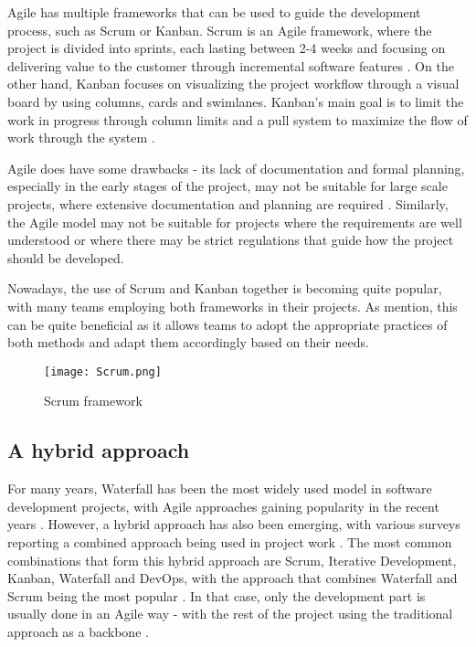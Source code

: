Agile has multiple frameworks that can be used to guide the development process, such as Scrum or Kanban. Scrum is an Agile framework, where the project is divided into sprints, each lasting between 2-4 weeks and focusing on delivering value to the customer through incremental software features \parencite{scrumban, agile}. On the other hand, Kanban focuses on visualizing the project workflow through a visual board by using columns, cards and swimlanes. Kanban's main goal is to limit the work in progress through column limits and a pull system to maximize the flow of work through the system \parencite{agile}.

Agile does have some drawbacks - its lack of documentation and formal planning, especially in the early stages of the project, may not be suitable for large scale projects, where extensive documentation and planning are required \parencite{sdlc1, agile, sdlc2}. Similarly, the Agile model may not be suitable for projects where the requirements are well understood or where there may be strict regulations that guide how the project should be developed.

Nowadays, the use of Scrum and Kanban together is becoming quite popular, with many teams employing both frameworks in their projects. As \textcite{scrumban} mention, this can be quite beneficial as it allows teams to adopt the appropriate practices of both methods and adapt them accordingly based on their needs.

\begin{figure}[ht]
    \centering
    \texttt{[image: Scrum.png]}
    \caption{Scrum framework}
    \label{fig:scrum}
\end{figure}

\subsection{A hybrid approach}

For many years, Waterfall has been the most widely used model in software development projects, with Agile approaches gaining popularity in the recent years \parencite{hybrid1}. However, a hybrid approach has also been emerging, with various surveys reporting a combined approach being used in project work \parencite{hybrid1,hybrid2}. The most common combinations that form this hybrid approach are Scrum, Iterative Development, Kanban, Waterfall and DevOps, with the approach that combines Waterfall and Scrum being the most popular \parencite{hybrid2}. In that case, only the development part is usually done in an Agile way - with the rest of the project using the traditional approach as a backbone \parencite{hybrid2}.

